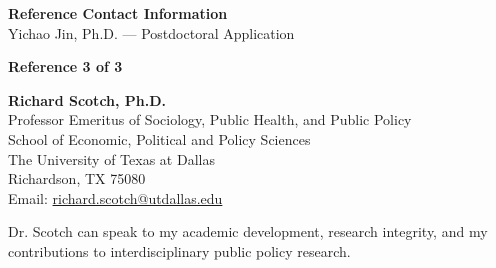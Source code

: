 \documentclass[11pt, letterpaper]{article}
\begin{document}
\thispagestyle{empty}

\begin{center}
    {\Large \textbf{Reference Contact Information}}\\
    \vspace{0.5em}
    Yichao Jin, Ph.D. --- Postdoctoral Application
\end{center}

\vspace{1.5em}

\begin{flushleft}
\textbf{Reference 3 of 3}
\end{flushleft}

\vspace{0.5em}

\begin{flushleft}
\textbf{Richard Scotch, Ph.D.}\\
\vspace{0.3em}
Professor Emeritus of Sociology, Public Health, and Public Policy\\
School of Economic, Political and Policy Sciences\\
The University of Texas at Dallas\\
Richardson, TX 75080\\
\vspace{0.5em}
Email: \href{mailto:richard.scotch@utdallas.edu}{richard.scotch@utdallas.edu}
\end{flushleft}

\vspace{1em}

\noindent Dr. Scotch can speak to my academic development, research integrity, and my contributions to interdisciplinary public policy research.
\end{document}
